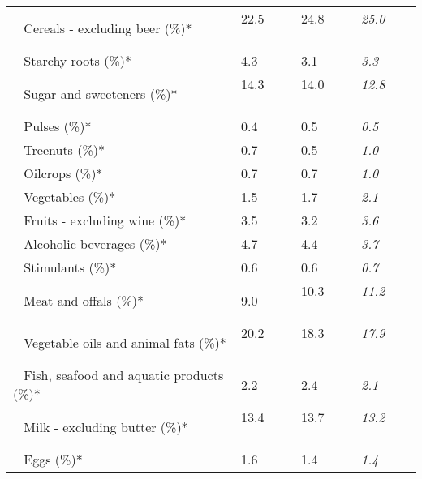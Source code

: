 \begin{tabular}{L{3.9cm} R{1cm} R{1cm} R{1cm}}
	 ~ Cereals - excluding beer (\%)* & 22.5 ~ \ \ & 24.8 ~ \ \ & \textit{25.0} ~ \ \ \\ 
	 ~ Starchy roots (\%)* & 4.3 ~ \ \ & 3.1 ~ \ \ & \textit{3.3} ~ \ \ \\ 
	 ~ Sugar and sweeteners (\%)* & 14.3 ~ \ \ & 14.0 ~ \ \ & \textit{12.8} ~ \ \ \\ 
	 ~ Pulses (\%)* & 0.4 ~ \ \ & 0.5 ~ \ \ & \textit{0.5} ~ \ \ \\ 
	 ~ Treenuts (\%)* & 0.7 ~ \ \ & 0.5 ~ \ \ & \textit{1.0} ~ \ \ \\ 
	 ~ Oilcrops (\%)* & 0.7 ~ \ \ & 0.7 ~ \ \ & \textit{1.0} ~ \ \ \\ 
	 ~ Vegetables (\%)* & 1.5 ~ \ \ & 1.7 ~ \ \ & \textit{2.1} ~ \ \ \\ 
	 ~ Fruits - excluding wine (\%)* & 3.5 ~ \ \ & 3.2 ~ \ \ & \textit{3.6} ~ \ \ \\ 
	 ~ Alcoholic beverages (\%)* & 4.7 ~ \ \ & 4.4 ~ \ \ & \textit{3.7} ~ \ \ \\ 
	 ~ Stimulants (\%)* & 0.6 ~ \ \ & 0.6 ~ \ \ & \textit{0.7} ~ \ \ \\ 
	 ~ Meat and offals (\%)* & 9.0 ~ \ \ & 10.3 ~ \ \ & \textit{11.2} ~ \ \ \\ 
	 ~ Vegetable oils and animal fats (\%)* & 20.2 ~ \ \ & 18.3 ~ \ \ & \textit{17.9} ~ \ \ \\ 
	 ~ Fish, seafood and aquatic products (\%)* & 2.2 ~ \ \ & 2.4 ~ \ \ & \textit{2.1} ~ \ \ \\ 
	 ~ Milk - excluding butter (\%)* & 13.4 ~ \ \ & 13.7 ~ \ \ & \textit{13.2} ~ \ \ \\ 
	 ~ Eggs (\%)* & 1.6 ~ \ \ & 1.4 ~ \ \ & \textit{1.4} ~ \ \ \\ 
       \toprule
      \end{tabular}
      \clearpage
{}
